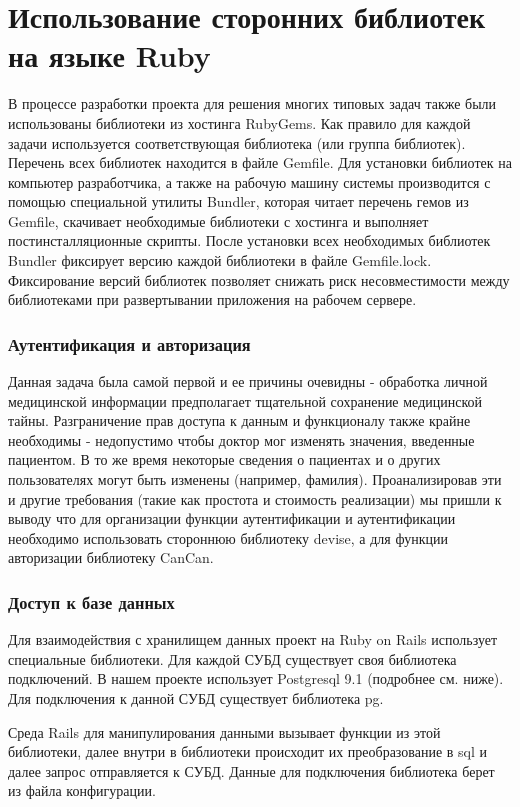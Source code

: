 \section{Использование сторонних библиотек на языке Ruby}
В процессе разработки проекта для решения многих типовых задач также были
использованы библиотеки из хостинга RubyGems. Как правило для каждой задачи
используется соответствующая библиотека (или группа библиотек). Перечень всех
библиотек находится в файле Gemfile. Для установки библиотек на компьютер
разработчика, а также на рабочую машину системы производится с помощью
специальной утилиты Bundler, которая читает перечень гемов из Gemfile, скачивает
необходимые библиотеки с хостинга и выполняет постинсталляционные скрипты. После
установки всех необходимых библиотек Bundler фиксирует версию каждой библиотеки
в файле Gemfile.lock. Фиксирование версий библиотек позволяет снижать риск
несовместимости между библиотеками при развертывании приложения на рабочем
сервере.

\subsubsection{Аутентификация и авторизация}
Данная задача была самой первой и ее причины очевидны - обработка личной
медицинской информации предполагает тщательной сохранение медицинской тайны.
Разграничение прав доступа к данным и функционалу также крайне необходимы -
недопустимо чтобы доктор мог изменять значения, введенные пациентом. В то же
время некоторые сведения о пациентах и о других пользователях могут быть
изменены (например, фамилия).
Проанализировав эти и другие требования (такие как простота и стоимость
реализации) мы пришли к выводу что для организации функции аутентификации и
аутентификации необходимо использовать стороннюю библиотеку devise, а для
функции авторизации библиотеку CanCan.

\subsubsection{Доступ к базе данных}
Для взаимодействия с хранилищем данных проект на Ruby on Rails использует
специальные библиотеки. Для каждой СУБД существует своя библиотека подключений.
В нашем проекте использует Postgresql 9.1 (подробнее см. ниже). Для подключения
к данной СУБД существует библиотека pg.
    
Среда Rails для манипулирования данными вызывает функции из этой библиотеки,
далее внутри в библиотеки происходит их преобразование в sql и далее запрос
отправляется к СУБД. Данные для подключения библиотека берет из файла
конфигурации.

